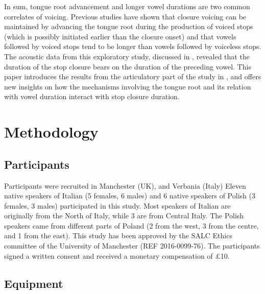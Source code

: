 \documentclass[12pt,]{article}
\begin{document}
In sum, tongue root advancement and longer vowel durations are two
common correlates of voicing. Previous studies have shown that closure
voicing can be maintained by advancing the tongue root during the
production of voiced stops (which is possibly initiated earlier than the
closure onset) and that vowels followed by voiced stops tend to be
longer than vowels followed by voiceless stops. The acoustic data from
this exploratory study, discussed in \citet{coretta2018j}, revealed that
the duration of the stop closure bears on the duration of the preceding
vowel. This paper introduces the results from the articulatory part of
the study in \citet{coretta2018j}, and offers new insights on how the
mechanisms involving the tongue root and its relation with vowel
duration interact with stop closure duration.

\hypertarget{methodology}{%
\section{Methodology}\label{methodology}}

\hypertarget{participants}{%
\subsection{Participants}\label{participants}}

Participants were recruited in Manchester (UK), and Verbania (Italy)
Eleven native speakers of Italian (5 females, 6 males) and 6 native
speakers of Polish (3 females, 3 males) participated in this study. Most
speakers of Italian are originally from the North of Italy, while 3 are
from Central Italy. The Polish speakers came from different parts of
Poland (2 from the west, 3 from the centre, and 1 from the east). This
study has been approved by the SALC Ethics committee of the University
of Manchester (REF 2016-0099-76). The participants signed a written
consent and received a monetary compensation of £10.

\hypertarget{equipment}{%
\subsection{Equipment}\label{equipment}}

\label{s:equipment}
\end{document}
